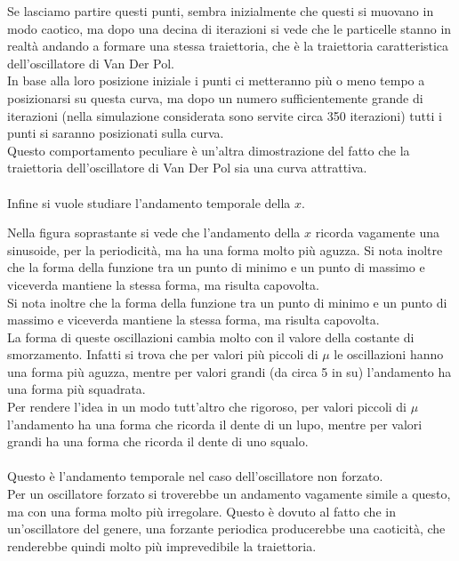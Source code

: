 \documentclass[12pt]{article}
\begin{document}
Se lasciamo partire questi punti, sembra inizialmente che questi si muovano in modo caotico, ma dopo una decina di iterazioni si vede che le particelle stanno in realtà andando a formare una stessa traiettoria, che è la traiettoria caratteristica dell'oscillatore di Van Der Pol. \\
In base alla loro posizione iniziale i punti ci metteranno più o meno tempo a posizionarsi su questa curva, ma dopo un numero sufficientemente grande di iterazioni (nella simulazione considerata sono servite circa 350 iterazioni) tutti i punti si saranno posizionati sulla curva. \\
Questo comportamento peculiare è un'altra dimostrazione del fatto che la traiettoria dell'oscillatore di Van Der Pol sia una curva attrattiva. \\ \\
Infine si vuole studiare l'andamento temporale della $x$. 
\begin{figure}[H]
	
\end{figure}
Nella figura soprastante si vede che l'andamento della $x$ ricorda vagamente una sinusoide, per la periodicità, ma ha una forma molto più aguzza. Si nota inoltre che la forma della funzione tra un punto di minimo e un punto di massimo e viceverda mantiene la stessa forma, ma risulta capovolta. \\
Si nota inoltre che la forma della funzione tra un punto di minimo e un punto di massimo e viceverda mantiene la stessa forma, ma risulta capovolta. \\
La forma di queste oscillazioni cambia molto con il valore della costante di smorzamento. Infatti si trova che per valori più piccoli di $\mu$ le oscillazioni hanno una forma più aguzza, mentre per valori grandi (da circa 5 in su) l'andamento ha una forma più squadrata. \\
Per rendere l'idea in un modo tutt'altro che rigoroso, per valori piccoli di $\mu$ l'andamento ha una forma che ricorda il dente di un lupo, mentre per valori grandi ha una forma che ricorda il dente di uno squalo. \\ \\ 
Questo è l'andamento temporale nel caso dell'oscillatore non forzato. \\
Per un oscillatore forzato si troverebbe un andamento vagamente simile a questo, ma con una forma molto più irregolare. Questo è dovuto al fatto che in un'oscillatore del genere, una forzante periodica producerebbe una caoticità, che renderebbe quindi molto più imprevedibile la traiettoria.
\end{document}
